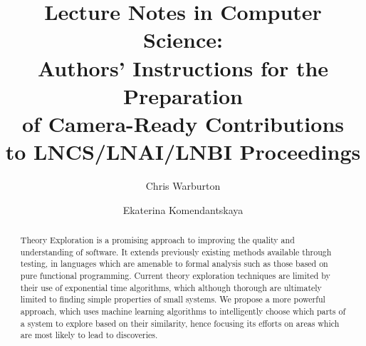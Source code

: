 \documentclass[]{article}
\begin{document}
\mainmatter  %

\iffalse TODO: actual title \fi
\title{Lecture Notes in Computer Science:\\Authors' Instructions
for the Preparation\\of Camera-Ready
Contributions\\to LNCS/LNAI/LNBI Proceedings}


%
%
\author{Chris Warburton%
\and Ekaterina Komendantskaya}
%


%
%

\maketitle

\begin{abstract}
Theory Exploration is a promising approach to improving the quality and understanding of software. It extends previously existing methods available through testing, in languages which are amenable to formal analysis such as those based on pure functional programming. Current theory exploration techniques are limited by their use of exponential time algorithms, which although thorough are ultimately limited to finding simple properties of small systems. We propose a more powerful approach, which uses machine learning algorithms to intelligently choose which parts of a system to explore based on their similarity, hence focusing its efforts on areas which are most likely to lead to discoveries.

\end{abstract}








\iffalse TODO: Section that brings back ML discussion to TE is missing \fi



\end{document}
